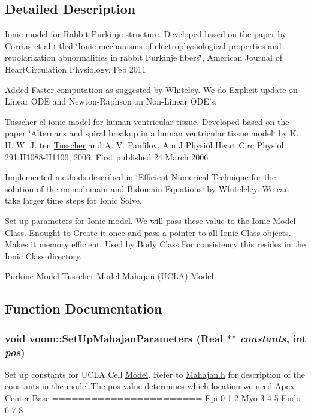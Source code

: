 \subsection{Detailed Description}
Ionic model for Rabbit \hyperlink{classvoom_1_1_purkinje}{Purkinje} structure. Developed based on the paper by Corrias et al titled \char`\"{}Ionic mechanisms of electrophysiological properties 
  and repolarization abnormalities in rabbit Purkinje fibers\char`\"{}, American Journal of HeartCirculation Physiology, Feb 2011
\begin{DoxyItemize}
\item Added Faster computation as suggested by Whiteley. We do Explicit update on Linear ODE and Newton-\/Raphson on Non-\/Linear ODE's. 
\end{DoxyItemize}\hyperlink{classvoom_1_1_tusscher}{Tusscher} el ionic model for human ventricular tissue. Developed based on the paper \char`\"{}Alternans and spiral breakup in a human ventricular tissue model\char`\"{} by K. H. W. J. ten \hyperlink{classvoom_1_1_tusscher}{Tusscher} and A. V. Panfilov, Am J Physiol Heart Circ Physiol 291:H1088-\/H1100, 2006. First published 24 March 2006
\begin{DoxyItemize}
\item Implemented methods described in \char`\"{}Efficient Numerical Technique for the 
  solution of the monodomain and Bidomain Equations\char`\"{} by Whiteleley. We can take larger time steps for Ionic Solve.
\end{DoxyItemize}

Set up parameters for Ionic model. We will pass these value to the Ionic \hyperlink{classvoom_1_1_model}{Model} Class. Enought to Create it once and pass a pointer to all Ionic Class objects. Makes it memory efficient. Used by Body Class For consistency this resides in the Ionic Class directory.

Purkine \hyperlink{classvoom_1_1_model}{Model} \hyperlink{classvoom_1_1_tusscher}{Tusscher} \hyperlink{classvoom_1_1_model}{Model} \hyperlink{classvoom_1_1_mahajan}{Mahajan} (UCLA) \hyperlink{classvoom_1_1_model}{Model} 

\subsection{Function Documentation}
\hypertarget{namespacevoom_a72a608e668a052d7b2a6f26a6e286702}{
\subsubsection[{SetUpMahajanParameters}]{\setlength{\rightskip}{0pt plus 5cm}void voom::SetUpMahajanParameters (Real $\ast$$\ast$ {\em constants}, \/  int {\em pos})}}
\label{namespacevoom_a72a608e668a052d7b2a6f26a6e286702}
Set up constants for UCLA Cell \hyperlink{classvoom_1_1_model}{Model}. Refer to \hyperlink{_mahajan_8h_source}{Mahajan.h} for description of the constants in the model.The pos value determines which location we need Apex Center Base ======================= Epi 0 1 2 Myo 3 4 5 Endo 6 7 8 